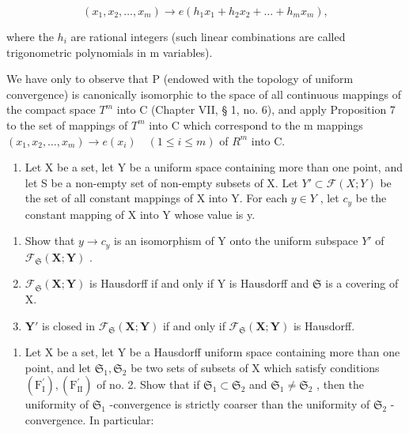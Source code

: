 \[
(x _ {1}, x _ {2}, \dots , x _ {m}) \rightarrow e (h _ {1} x _ {1} + h _ {2} x _ {2} + \dots + h _ {m} x _ {m}),
\]

where the \(h_{i}\) are rational integers (such linear combinations are called trigonometric polynomials in m variables).

We have only to observe that P (endowed with the topology of uniform convergence) is canonically isomorphic to the space of all continuous mappings of the compact space \(T^{m}\) into C (Chapter VII, § 1, no. 6), and apply Proposition 7 to the set of mappings of \(T^{m}\) into C which correspond to the m mappings \((x_{1}, x_{2}, \ldots, x_{m}) \to e(x_{i}) \quad (1 \leqslant i \leqslant m)\) of \(R^{m}\) into C.

\ExerciseGroupsStart

\ExerciseSection

\begin{enumerate}
\def\labelenumi{\arabic{enumi})}
\tightlist
\item
  Let X be a set, let Y be a uniform space containing more than one point, and let S be a non-empty set of non-empty subsets of X. Let \(Y' \subset \mathcal{F}(X; Y)\) be the set of all constant mappings of X into Y. For each \(y \in Y\) , let \(c_{y}\) be the constant mapping of X into Y whose value is y.
\end{enumerate}

\begin{enumerate}
\def\labelenumi{\alph{enumi})}
\item
  Show that \(y \to c_{y}\) is an isomorphism of Y onto the uniform subspace \(Y'\) of \(\mathcal{F}_{\mathfrak{S}}(\mathbf{X}; \mathbf{Y})\) .
\item
  \(\mathcal{F}_{\mathfrak{S}}(\mathbf{X};\mathbf{Y})\) is Hausdorff if and only if Y is Hausdorff and \(\mathfrak{S}\) is a covering of X.
\item
  \(\mathbf{Y}'\) is closed in \(\mathcal{F}_{\mathfrak{S}}(\mathbf{X};\mathbf{Y})\) if and only if \(\mathcal{F}_{\mathfrak{S}}(\mathbf{X};\mathbf{Y})\) is Hausdorff.
\end{enumerate}

\begin{enumerate}
\def\labelenumi{\arabic{enumi})}
\setcounter{enumi}{1}
\tightlist
\item
  Let X be a set, let Y be a Hausdorff uniform space containing more than one point, and let \(\mathfrak{S}_1, \mathfrak{S}_2\) be two sets of subsets of X which satisfy conditions \((\mathrm{F}_{\mathrm{I}}^{\prime}), (\mathrm{F}_{\mathrm{II}}^{\prime})\) of no. 2. Show that if \(\mathfrak{S}_1 \subset \mathfrak{S}_2\) and \(\mathfrak{S}_1 \neq \mathfrak{S}_2\) , then the uniformity of \(\mathfrak{S}_1\) -convergence is strictly coarser than the uniformity of \(\mathfrak{S}_2\) -convergence. In particular:
\end{enumerate}

